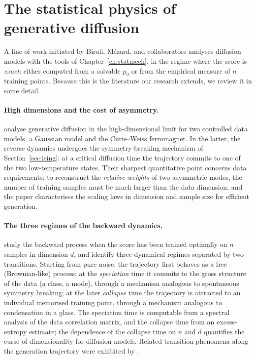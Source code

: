 \section{The statistical physics of generative diffusion}
\label{sec:statphys-diffusion}

A line of work initiated by Biroli, M\'ezard, and collaborators analyses
diffusion models with the tools of Chapter~\ref{ch:statmech}, in the
regime where the score is \emph{exact}: either computed from a solvable
$p_0$ or from the empirical measure of $n$ training points. Because this
is the literature our research extends, we review it in some detail.

\paragraph{High dimensions and the cost of asymmetry.}
\citet{biroli2023generative} analyse generative diffusion in the
high-dimensional limit for two controlled data models, a Gaussian model
and the Curie--Weiss ferromagnet. In the latter, the reverse dynamics
undergoes the symmetry-breaking mechanism of Section~\ref{sec:ising}: at
a critical diffusion time the trajectory commits to one of the two
low-temperature states. Their sharpest quantitative point concerns data
requirements: to reconstruct the \emph{relative weights} of two
asymmetric modes, the number of training samples must be much larger than
the data dimension, and the paper characterises the scaling laws in
dimension and sample size for efficient generation.

\paragraph{The three regimes of the backward dynamics.}
\citet{biroli2024dynamical} study the backward process when the score has
been trained optimally on $n$ samples in dimension $d$, and identify
three dynamical regimes separated by two transitions. Starting from pure
noise, the trajectory first behaves as a free (Brownian-like) process;
at the \emph{speciation} time it commits to the gross structure of the
data (a class, a mode), through a mechanism analogous to spontaneous
symmetry breaking; at the later \emph{collapse} time the trajectory is
attracted to an individual memorised training point, through a mechanism
analogous to condensation in a glass. The speciation time is computable
from a spectral analysis of the data correlation matrix, and the collapse
time from an excess-entropy estimate; the dependence of the collapse time
on $n$ and $d$ quantifies the curse of dimensionality for diffusion
models. Related transition phenomena along the generation trajectory were
exhibited by \citet{raya2023spontaneous}.

